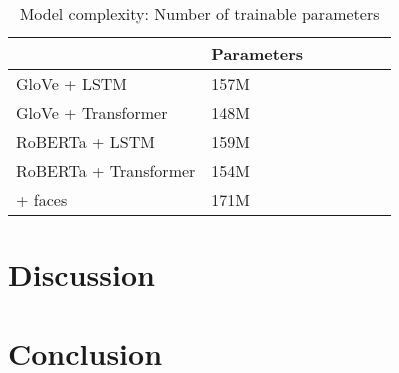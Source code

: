 \documentclass[10pt,twocolumn,letterpaper]{article}
\begin{document}
\begin{table}[t]
	\caption {Model complexity: Number of trainable parameters}
	\label{tab:models}
	\centering
	\begin{tabular}{lllllll}
		\toprule
        & Parameters \\
      \midrule
      GloVe + LSTM & 157M \\
      GloVe + Transformer & 148M \\
      RoBERTa + LSTM & 159M \\
      RoBERTa + Transformer & 154M \\
        + faces & 171M \\
		\bottomrule
	\end{tabular}
\end{table}

\section{Discussion}




\section{Conclusion}

{\small


}
\end{document}
